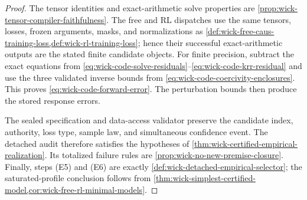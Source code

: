 \documentclass[11pt]{article}
\numberwithin{section}{part}
\theoremstyle{plain}
\theoremstyle{definition}
\theoremstyle{remark}
\begin{document}
\begin{proof}
The tensor identities and exact-arithmetic solve properties are
\cref{prop:wick-tensor-compiler-faithfulness}.  The free and RL dispatches use
the same tensors, losses, frozen arguments, masks, and normalizations as
\cref{def:wick-free-caus-training-loss,def:wick-rl-training-loss}; hence their
successful exact-arithmetic outputs are the stated finite candidate objects.
For finite precision, subtract the exact equations from
\eqref{eq:wick-code-solve-residuals}--\eqref{eq:wick-code-krr-residual} and use
the three validated inverse bounds from
\eqref{eq:wick-code-coercivity-enclosures}.  This proves
\eqref{eq:wick-code-forward-error}.  The perturbation bounds then produce the
stored response errors.

The sealed specification and data-access validator preserve the candidate
index, authority, loss type, sample law, and simultaneous confidence event.
The detached audit therefore satisfies the hypotheses of
\cref{thm:wick-certified-empirical-realization}.  Its totalized failure rules
are \cref{prop:wick-no-new-premise-closure}.  Finally, steps \textup{(E5)} and
\textup{(E6)} are exactly
\cref{def:wick-detached-empirical-selector}; the saturated-profile conclusion
follows from \cref{thm:wick-simplest-certified-model,cor:wick-free-rl-minimal-models}.
\end{proof}
\end{document}
